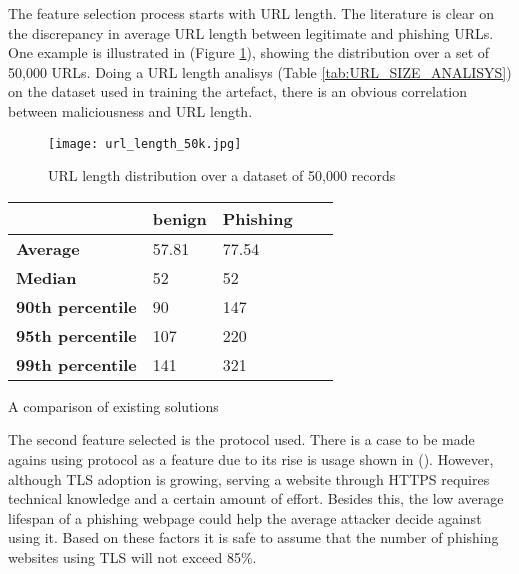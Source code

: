 The feature selection process starts with URL length. The literature is clear on the discrepancy in average URL length between legitimate and phishing URLs. One example is illustrated in \cite{STACKED_ML_URL_HTML} (Figure \ref{fig:URL_LENGTH_DISTRIBUTION}), showing the distribution over a set of 50,000 URLs. Doing a URL length analisys (Table \ref{tab:URL_SIZE_ANALISYS}) on the dataset used in training the artefact, there is an obvious correlation between maliciousness and URL length.

\begin{figure}[t]
	\centering
	\texttt{[image: url\_length\_50k.jpg]}
	\caption{URL length distribution over a dataset of 50,000 records}
	\label{fig:URL_LENGTH_DISTRIBUTION}
\end{figure}

\begin{singlespace}
	\small
	\begin{center}
		\label{tab:URL_SIZE_ANALISYS}
		\begin{tabular}{ | m{8em} | m{13em} | m{8.5em} | m{2.3em} | m{5em} | }
			\hline
			                         & \textbf{benign} & \textbf{Phishing} \\
			\hline
			\textbf{Average}         & 57.81           & 77.54             \\
			\hline
			\textbf{Median}          & 52              & 52                \\
			\hline
			\textbf{90th percentile} & 90              & 147                \\
			\hline
			\textbf{95th percentile} & 107              & 220                \\
			\hline
			\textbf{99th percentile} & 141              & 321                \\
			\hline
		\end{tabular}
		\captionsetup{type=table}\caption{A comparison of existing solutions \citep{INTELLIGENT_PHISHING_ANFIS}}
	\end{center}
\end{singlespace}


The second feature selected is the protocol used. There is a case to be made agains using protocol as a feature due to its rise is usage shown in (). However, although TLS adoption is growing, serving a website through HTTPS requires technical knowledge and a certain amount of effort. Besides this, the low average lifespan of a phishing webpage could help the average attacker decide against using it. Based on these factors it is safe to assume that the number of phishing websites using TLS will not exceed 85\%.

